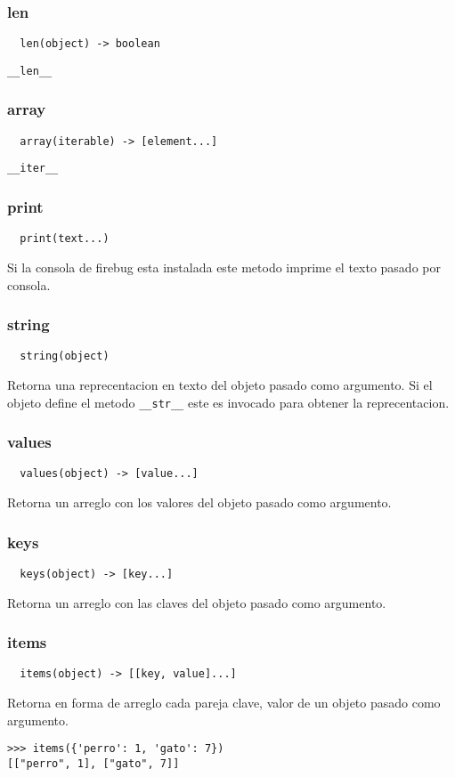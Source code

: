 \subsubsection*{len}
\begin{verbatim}
  len(object) -> boolean
\end{verbatim}
\verb|__len__|

\subsubsection*{array}
\begin{verbatim}
  array(iterable) -> [element...]
\end{verbatim}
\verb|__iter__|

\subsubsection*{print}
\begin{verbatim}
  print(text...)
\end{verbatim}
Si la consola de firebug esta instalada este metodo imprime el texto pasado por consola.

\subsubsection*{string}
\begin{verbatim}
  string(object)
\end{verbatim}
Retorna una reprecentacion en texto del objeto pasado como argumento.
Si el objeto define el metodo \verb|__str__| este es invocado para obtener la reprecentacion.

\subsubsection*{values}
\begin{verbatim}
  values(object) -> [value...]
\end{verbatim}
Retorna un arreglo con los valores del objeto pasado como argumento.

\subsubsection*{keys}
\begin{verbatim}
  keys(object) -> [key...]
\end{verbatim}
Retorna un arreglo con las claves del objeto pasado como argumento.

\subsubsection*{items}
\begin{verbatim}
  items(object) -> [[key, value]...]
\end{verbatim}
Retorna en forma de arreglo cada pareja clave, valor de un objeto pasado como
argumento.
\begin{lstlisting}[style=consola]
>>> items({'perro': 1, 'gato': 7})
[["perro", 1], ["gato", 7]]
\end{lstlisting}

